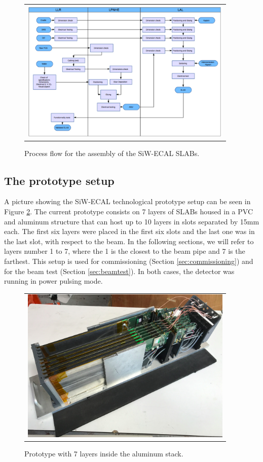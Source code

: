 \documentclass[a4paper,11pt]{article}
\begin{document}
\begin{figure}[!t]
\centering
\begin{tabular}{l}
\includegraphics[width=4.0in]{../figs/assembly.png} 
\end{tabular}
\caption{Process flow for the assembly of the SiW-ECAL SLABs.}
\label{assembly}
\end{figure}

\subsection{The prototype setup}
\label{sec:setup2}

A picture showing the SiW-ECAL technological prototype setup can be seen in Figure \ref{proto}.
The current prototype consists on 7 layers of SLABs housed in a PVC and aluminum structure that can host up to 10 layers in slots separated by 15mm each.
The first six layers were placed in the first six slots and the last one was in the last slot, with respect to the beam. In the following sections, we will refer to layers number 1 to 7, where
the 1 is the closest to the beam pipe and 7 is the farthest.
This setup is used for commissioning (Section \ref{sec:commissioning}) and for the beam test
(Section \ref{sec:beamtest}). In both cases, the detector was
running in power pulsing mode. 

\begin{figure}[!ht]
\centering
\begin{tabular}{l}
\includegraphics[width=4.0in]{../figs/proto.png} 
\end{tabular}
\caption{Prototype with 7 layers inside the aluminum stack.}
\label{proto}
\end{figure}
\end{document}

